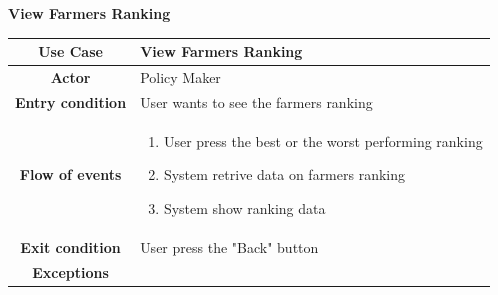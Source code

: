 \documentclass[table, 12pt]{article}
\begin{document}
\begin{itemize}
            \begin{table}[H]
                \item[] \textbf{View Farmers Ranking}
                \item[] 
                \centering
                \begin{tabular}{|c| m{}|}
                    \hline
                    \textbf{Use Case} & View Farmers Ranking\\ \hline
                    \textbf{Actor} & Policy Maker\\ \hline
                    \textbf{Entry condition} & User wants to see the farmers ranking\\  \hline
                    \textbf{Flow of events} & \begin{enumerate}
                                                \item User press the best or the worst performing ranking
                                                \item System retrive data on farmers ranking
                                                \item System show ranking data 
                                            \end{enumerate}\\ \hline
                    \textbf{Exit condition} & User press the "Back" button\\ \hline
                    \textbf{Exceptions} &  \\ \hline                    
                \end{tabular}
            \end{table}


\end{itemize}
\end{document}
